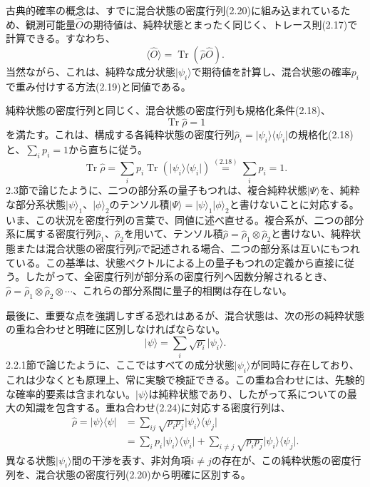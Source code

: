 古典的確率の概念は、すでに混合状態の密度行列(2.20)に組み込まれているため、観測可能量$\hat O$の期待値は、純粋状態とまったく同じく、トレース則(2.17)で計算できる。すなわち、
\begin{equation}\langle\hat O\rangle=\operatorname{Tr}(\hat\rho\hat O).\tag{2.21}\end{equation}
当然ながら、これは、純粋な成分状態$\lvert\psi_i\rangle$で期待値を計算し、混合状態の確率$p_i$で重み付けする方法(2.19)と同値である。

純粋状態の密度行列と同じく、混合状態の密度行列も規格化条件(2.18)、
\begin{equation}\operatorname{Tr}\hat\rho=1\tag{2.22}\end{equation}
を満たす。これは、構成する各純粋状態の密度行列$\hat\rho_i=\lvert\psi_i\rangle\langle\psi_i\rvert$の規格化(2.18)と、$\sum_i p_i=1$から直ちに従う。
\hypertarget{srcpage:39}{}\label{srcpage:39}
\begin{equation}\operatorname{Tr}\hat\rho=\sum_i p_i\operatorname{Tr}(\lvert\psi_i\rangle\langle\psi_i\rvert)\overset{(2.18)}=\sum_i p_i=1.\tag{2.23}\end{equation}
2.3節で論じたように、二つの部分系の量子もつれは、複合純粋状態$\lvert\Psi\rangle$を、純粋な部分系状態$\lvert\psi\rangle_1$、$\lvert\phi\rangle_2$のテンソル積$\lvert\Psi\rangle=\lvert\psi\rangle_1\lvert\phi\rangle_2$と書けないことに対応する。いま、この状況を密度行列の言葉で、同値に述べ直せる。複合系が、二つの部分系に属する密度行列$\hat\rho_1$、$\hat\rho_2$を用いて、テンソル積$\hat\rho=\hat\rho_1\otimes\hat\rho_2$と書けない、純粋状態または混合状態の密度行列$\hat\rho$で記述される場合、二つの部分系は互いにもつれている。この基準は、状態ベクトルによる上の量子もつれの定義から直接に従う。したがって、全密度行列が部分系の密度行列へ因数分解されるとき、$\hat\rho=\hat\rho_1\otimes\hat\rho_2\otimes\cdots$、これらの部分系間に量子的相関は存在しない。

最後に、重要な点を強調しすぎる恐れはあるが、混合状態は、次の形の純粋状態の重ね合わせと明確に区別しなければならない。
\begin{equation}\lvert\psi\rangle=\sum_i\sqrt{p_i}\lvert\psi_i\rangle.\tag{2.24}\end{equation}
2.2.1節で論じたように、ここではすべての成分状態$\lvert\psi_i\rangle$が同時に存在しており、これは少なくとも原理上、常に実験で検証できる。この重ね合わせには、先験的な確率的要素は含まれない。$\lvert\psi\rangle$は純粋状態であり、したがって系についての最大の知識を包含する。重ね合わせ(2.24)に対応する密度行列は、
\begin{equation}\begin{split}\hat\rho=\lvert\psi\rangle\langle\psi\rvert&=\sum_{ij}\sqrt{p_ip_j}\lvert\psi_i\rangle\langle\psi_j\rvert\\&=\sum_i p_i\lvert\psi_i\rangle\langle\psi_i\rvert+\sum_{i\ne j}\sqrt{p_ip_j}\lvert\psi_i\rangle\langle\psi_j\rvert.\end{split}\tag{2.25}\end{equation}
異なる状態$\lvert\psi_i\rangle$間の干渉を表す、非対角項$i\ne j$の存在が、この純粋状態の密度行列を、混合状態の密度行列(2.20)から明確に区別する。
